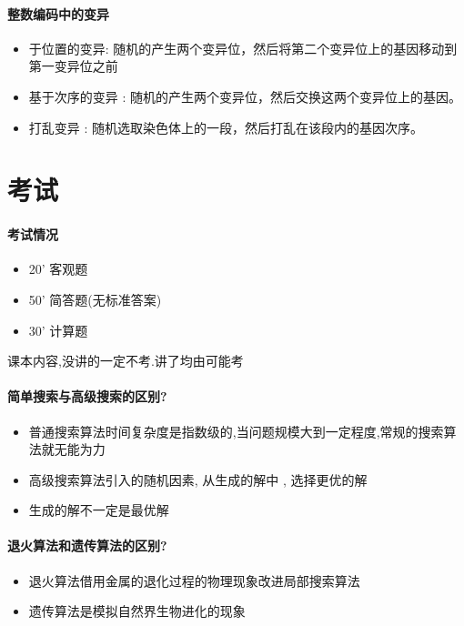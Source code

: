 \documentclass[UTF8,a4paper]{ctexart}
\begin{document}
\paragraph{整数编码中的变异}
\begin{itemize}
	\item 于位置的变异:
	      随机的产生两个变异位，然后将第二个变异位上的基因移动到第一变异位之前
	\item 基于次序的变异 : 随机的产生两个变异位，然后交换这两个变异位上的基因。
	\item 打乱变异 : 随机选取染色体上的一段，然后打乱在该段内的基因次序。
\end{itemize}

\section{考试}
\paragraph{考试情况}
\begin{itemize}
	\item 20' 客观题
	\item 50' 简答题(无标准答案)
	\item 30' 计算题
\end{itemize}

课本内容,没讲的一定不考.讲了均由可能考

\paragraph{简单搜索与高级搜索的区别?}
\begin{itemize}
	\item 普通搜索算法时间复杂度是指数级的,当问题规模大到一定程度,常规的搜索算法就无能为力
	\item 高级搜索算法引入的随机因素, 从生成的解中 , 选择更优的解	
	\item 生成的解不一定是最优解
\end{itemize}

\paragraph{退火算法和遗传算法的区别?}
\begin{itemize}
	\item 退火算法借用金属的退化过程的物理现象改进局部搜索算法
	\item 遗传算法是模拟自然界生物进化的现象
\end{itemize}
\end{document}
